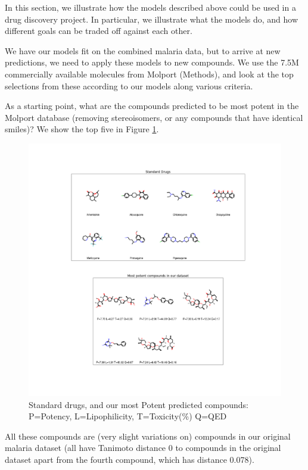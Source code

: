 \documentclass{article}
\begin{document}
In this section, we illustrate how the models described above could be used in a drug discovery project. In particular, we illustrate what the models do, and how different goals can be traded off against each other.

We have our models fit on the combined malaria data, but to arrive at new predictions, we need to apply these models to new compounds.  We use the 7.5M commercially available molecules from Molport (Methods), and look at the top selections from these according to our models along various criteria.

As a starting point, what are the compounds predicted to be most potent in the Molport database (removing stereoisomers, or any compounds that have identical 
smiles)?  We show the top five in Figure \ref{fig:mostpot}.

\begin{figure}[h!]
\centering
\includegraphics[width=\textwidth]{fig6_drugs_n_pot.png}
\caption{Standard drugs, and our most Potent predicted compounds: P=Potency, L=Lipophilicity, T=Toxicity(\%) Q=QED}
\label{fig:mostpot}
\end{figure}


All these compounds are (very slight variations on) compounds in our original malaria dataset (all have Tanimoto distance 0 to compounds in the original dataset apart from the fourth compound, which has distance 0.078).  
\end{document}
